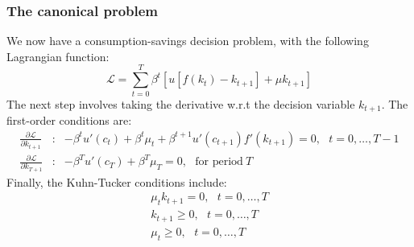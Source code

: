 \documentclass[10pt, handout]{beamer}
\begin{document}
\begin{frame}
\frametitle{ The canonical problem}
We now have a consumption-savings decision problem, with the following Lagrangian function:
\begin{equation}
\mathcal{L} = \sum^{T}_{t=0} \beta^t [u[f(k_t) - k_{t+1}] + {\mu}k_{t+1}]
\end{equation}
The next step involves taking the derivative w.r.t the decision variable $k_{t+1}$. The first-order conditions are:
\begin{eqnarray}\nonumber
\frac{\partial\mathcal{L}}{\partial{k_{t+1}}} &:& - \beta^{t}u'(c_t) + \beta^{t}\mu_t + \beta^{t+1}u'(c_{t+1})f'(k_{t+1}) = 0, ~~~ t=0, \ldots , T-1 \\ \nonumber
\frac{\partial\mathcal{L}}{\partial{k_{T+1}}} &:& - \beta^{T}u'(c_T) + \beta^{T}\mu_T = 0  , ~~~ {\text{for period}}~T
\end{eqnarray}
Finally, the Kuhn-Tucker conditions include:
\begin{eqnarray}\nonumber
\mu_{t}k_{t+1} = 0, ~~~ t=0, \ldots , T \\ \nonumber
k_{t+1} \geq 0, ~~~ t=0, \ldots , T \\ \nonumber
\mu_{t} \geq 0, ~~~ t=0, \ldots , T 
\end{eqnarray}

\end{frame}
\end{document}
